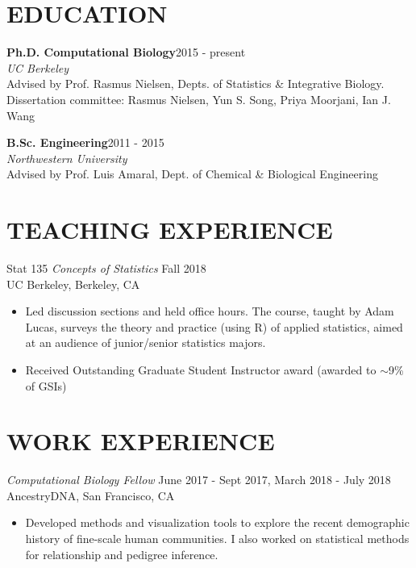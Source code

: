 \documentclass[margin, 10pt]{res} %
\begin{document}
\begin{resume}

 
\section{EDUCATION}  
{\bf Ph.D. Computational Biology}\hfill 2015 - present\\
{\sl UC Berkeley}\\
Advised by Prof. Rasmus Nielsen, Depts. of Statistics \& Integrative Biology.\\
Dissertation committee: Rasmus Nielsen, Yun S. Song, Priya Moorjani, Ian J. Wang

{\bf B.Sc. Engineering}\hfill 2011 - 2015\\
{\sl Northwestern University}\\
Advised by Prof. Luis Amaral, Dept. of Chemical \& Biological Engineering

\section{TEACHING EXPERIENCE}
 Stat 135 {\sl Concepts of Statistics}  \hfill Fall 2018\\
UC Berkeley, Berkeley, CA\\
\begin{itemize}
\item[] Led discussion sections and held office hours. The course, taught by Adam Lucas, surveys the theory and practice (using R) of applied statistics, aimed at an audience of junior/senior statistics majors. 
\item[] Received Outstanding Graduate Student Instructor award (awarded to $\sim$9\% of GSIs)
\end{itemize} 

\section{WORK EXPERIENCE}
{\sl Computational Biology Fellow} \hfill June 2017 - Sept 2017, March 2018 - July 2018 \\
AncestryDNA, San Francisco, CA
\begin{itemize}
\item[] Developed methods and visualization tools to explore the recent demographic history of fine-scale human communities. I also worked on statistical methods for relationship and pedigree inference. 
\end{itemize} 


\end{resume}
\end{document}
